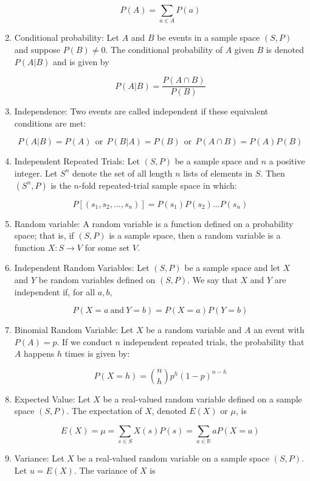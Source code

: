 \documentclass{article}
\begin{document}
\begin{enumerate}
    \[P(A)=\sum_{a\in A}P(a)\]
    
    \item Conditional probability: Let $A$ and $B$ be events in a sample space $(S,P)$ and suppose $P(B)\neq 0$. The conditional probability of $A$ given $B$ is denoted $P(A|B)$ and is given by 
    
    \[P(A|B)=\frac{P(A\cap B)}{P(B)}\]
    
    \item Independence: Two events are called independent if these equivalent conditions are met: 
    
    \[P(A|B)=P(A)\:\: \text{or} \:\: P(B|A)=P(B) \:\: \text{or} \:\: P(A\cap B)=P(A)P(B)\]
    
    \item Independent Repeated Trials: Let $(S,P)$ be a sample space and $n$ a positive integer. Let $S^n$ denote the set of all length $n$ lists of elements in $S$. Then $(S^n,P)$ is the $n$-fold repeated-trial sample space in which: 
    
    \[P[(s_1,s_2,...,s_n)]=P(s_1)P(s_2)...P(s_n)\]
    
    \item Random variable: A random variable is a function defined on a probability space; that is, if $(S,P)$ is a sample space, then a random variable is a function $X:S\to V$ for some set $V$.
    
    \item Independent Random Variables: Let $(S,P)$ be a sample space and let $X$ and $Y$ be random variables defined on $(S,P)$. We say that $X$ and $Y$ are independent if, for all $a,b$, 
    
    \[P(X=a\: \text{and} \: Y=b)=P(X=a)P(Y=b)\]
    
    \item Binomial Random Variable: Let $X$ be a random variable and $A$ an event with $P(A)=p$. If we conduct $n$ independent repeated trials, the probability that $A$ happens $h$ times is given by:
    
     \[P(X=h)= {n \choose h} p^h(1-p)^{n-h}\]
    
    \item Expected Value: Let $X$ be a real-valued random variable defined on a sample space $(S,P)$. The expectation of $X$, denoted $E(X)$ or $\mu$, is 
    
    \[E(X)=\mu=\sum_{s\in S}X(s)P(s)=\sum_{a\in\mathbb{R}}aP(X=a)\]
    
    \item Variance: Let $X$ be a real-valued random variable on a sample space $(S,P)$. Let $u=E(X)$. The variance of $X$ is
    

\end{enumerate}
\end{document}
